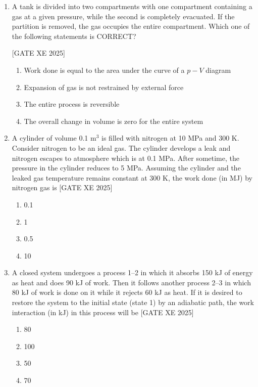 \documentclass[journal,12pt,onecolumn]{IEEEtran}
\theoremstyle{remark}
\begin{document}
\begin{enumerate}
\hfill[GATE XE 2025]

\item  A tank is divided into two compartments with one compartment containing a gas at a given pressure, while the second is completely evacuated. If the partition is removed, the gas occupies the entire compartment. Which one of the following statements is CORRECT?

\hfill[GATE XE 2025]
\begin{multicols}{2}
\begin{enumerate}
\item Work done is equal to the area under the curve of a $p\!-\!V$ diagram
\item Expansion of gas is not restrained by external force
\item The entire process is reversible
\item The overall change in volume is zero for the entire system
\end{enumerate}
\end{multicols}

\item A cylinder of volume 0.1 m$^3$ is filled with nitrogen at 10 MPa and 300 K. Consider nitrogen to be an ideal gas. The cylinder develops a leak and nitrogen escapes to atmosphere which is at 0.1 MPa. After sometime, the pressure in the cylinder reduces to 5 MPa. Assuming the cylinder and the leaked gas temperature remains constant at 300 K, the work done (in MJ) by nitrogen gas is
\hfill[GATE XE 2025]
\begin{multicols}{2}
\begin{enumerate}
\item 0.1
\item 1
\item 0.5
\item 10
\end{enumerate}
\end{multicols}

\item A closed system undergoes a process 1–2 in which it absorbs 150 kJ of energy as heat and does 90 kJ of work. Then it follows another process 2–3 in which 80 kJ of work is done on it while it rejects 60 kJ as heat. If it is desired to restore the system to the initial state (state 1) by an adiabatic path, the work interaction (in kJ) in this process will be
\hfill[GATE XE 2025]
\begin{multicols}{2}
\begin{enumerate}
\item 80
\item 100
\item 50
\item 70
\end{enumerate}
\end{multicols}


\end{enumerate}
\end{document}
